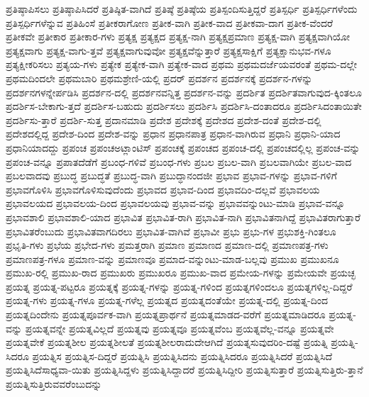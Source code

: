 {ಪ್ರತಿಷ್ಠಾಪಿಸಲು
ಪ್ರತಿಷ್ಠಾಪಿಸಿದರೆ
ಪ್ರತಿಷ್ಠಿತ-ವಾಗಿದೆ
ಪ್ರತಿಷ್ಠೆ
ಪ್ರತಿಷ್ಠೆಯ
ಪ್ರತಿಸ್ಪಂದಿಸುತ್ತಿದ್ದರೆ
ಪ್ರತಿಸ್ಪರ್ಧಿ
ಪ್ರತಿಸ್ಪರ್ಧಿಗಳೆಂದು
ಪ್ರತಿಸ್ಪರ್ಧಿಗಳೆನ್ನುವ
ಪ್ರತಿಹಿಂಸೆ
ಪ್ರತೀಕರಾಗೋಣ
ಪ್ರತೀಕ-ವಾಗಿ
ಪ್ರತೀಕ-ವಾದ
ಪ್ರತೀಕವಾ-ದಾಗ
ಪ್ರತೀಕ-ವೆಂದರೆ
ಪ್ರತೀಕವೇ
ಪ್ರತೀಕಾರ
ಪ್ರತೀಕಾರ-ಗಳು
ಪ್ರತ್ಯಕ್ಷ
ಪ್ರತ್ಯಕ್ಷದ
ಪ್ರತ್ಯಕ್ಷ-ನಾಗಿ
ಪ್ರತ್ಯಕ್ಷಪ್ರಮಾಣ
ಪ್ರತ್ಯಕ್ಷ-ವಾಗಿ
ಪ್ರತ್ಯಕ್ಷವಾಗಿಯೋ
ಪ್ರತ್ಯಕ್ಷವಾಗು
ಪ್ರತ್ಯಕ್ಷ-ವಾಗು-ತ್ತವೆ
ಪ್ರತ್ಯಕ್ಷವಾಗುವುವೋ
ಪ್ರತ್ಯಕ್ಷವೆನ್ನುತ್ತಾರೆ
ಪ್ರತ್ಯಕ್ಷಸಾಕ್ಷಿಗೆ
ಪ್ರತ್ಯಕ್ಷಾನುಭವ-ಗಳೂ
ಪ್ರತ್ಯಕ್ಷೀಕರಿಸಲು
ಪ್ರತ್ಯಯ-ಗಳು
ಪ್ರತ್ಯೇಕ
ಪ್ರತ್ಯೇಕ-ವಾಗಿ
ಪ್ರತ್ಯೇಕ-ವಾದ
ಪ್ರಥಮ
ಪ್ರಥಮದರ್ಜೆಯವರಂತೆ
ಪ್ರಥಮ-ದಲ್ಲೇ
ಪ್ರಥಮದಿಂದಲೇ
ಪ್ರಥಮಬಾರಿ
ಪ್ರಥಮಶ್ರೇಣಿ-ಯಲ್ಲಿ
ಪ್ರದರ್
ಪ್ರದರ್ಶನ
ಪ್ರದರ್ಶನಕ್ಕೆ
ಪ್ರದರ್ಶನ-ಗಳನ್ನು
ಪ್ರದರ್ಶನಗಳನ್ನೇರ್ಪಡಿಸಿ
ಪ್ರದರ್ಶನ-ದಲ್ಲಿ
ಪ್ರದರ್ಶನವನ್ನಿತ್ತ
ಪ್ರದರ್ಶನ-ವನ್ನು
ಪ್ರದರ್ಶಿತ
ಪ್ರದರ್ಶಿತವಾಗುವುದ-ಕ್ಕಿಂತಲೂ
ಪ್ರದರ್ಶಿಸ-ಬೇಕಾಗು-ತ್ತದೆ
ಪ್ರದರ್ಶಿಸ-ಬಹುದು
ಪ್ರದರ್ಶಿಸಲು
ಪ್ರದರ್ಶಿಸಿ
ಪ್ರದರ್ಶಿಸಿ-ದಂತಾದರೂ
ಪ್ರದರ್ಶಿಸಿದಂತಾಯಿತೇ
ಪ್ರದರ್ಶಿಸು-ತ್ತಾರೆ
ಪ್ರದರ್ಶಿ-ಸುತ್ತ
ಪ್ರದಾನಮಾಡಿ
ಪ್ರದೇಶ
ಪ್ರದೇಶಕ್ಕೆ
ಪ್ರದೇಶದ
ಪ್ರದೇಶ-ದಂತೆ
ಪ್ರದೇಶ-ದಲ್ಲಿ
ಪ್ರದೇಶದಲ್ಲಿದ್ದ
ಪ್ರದೇಶ-ದಿಂದ
ಪ್ರದೇಶ-ವನ್ನು
ಪ್ರಧಾನ
ಪ್ರಧಾನಪಾತ್ರ
ಪ್ರಧಾನ-ವಾಗಿರುವ
ಪ್ರಧಾನಿ
ಪ್ರಧಾನಿ-ಯಾದ
ಪ್ರಧಾನಿಯಾದದ್ದು
ಪ್ರಪಂಚ
ಪ್ರಪಂಚಅಟ್ಲಾಂಟಿಸ್
ಪ್ರಪಂಚಕ್ಕೆ
ಪ್ರಪಂಚದ
ಪ್ರಪಂಚ-ದಲ್ಲಿ
ಪ್ರಪಂಚದಲ್ಲಿಲ್ಲ
ಪ್ರಪಂಚ-ವನ್ನು
ಪ್ರಪಂಚ-ವನ್ನೂ
ಪ್ರಪಾತದೆಡೆಗೆ
ಪ್ರಬಂಧ-ಗಳಿವೆ
ಪ್ರಬಂಧ-ಗಳು
ಪ್ರಬಲ
ಪ್ರಬಲ-ವಾಗಿ
ಪ್ರಬಲವಾಗಿಯೇ
ಪ್ರಬಲ-ವಾದ
ಪ್ರಬಲವಾದವು
ಪ್ರಬುದ್ಧ
ಪ್ರಬುದ್ಧತೆ
ಪ್ರಬುದ್ಧ-ವಾಗಿ
ಪ್ರಬುದ್ಧಾನಂದಜೀ
ಪ್ರಭಾವ
ಪ್ರಭಾವ-ಗಳನ್ನು
ಪ್ರಭಾವ-ಗಳಿಗೆ
ಪ್ರಭಾವಗೊಳಿಸಿ
ಪ್ರಭಾವಗೊಳಿಸುವುದೆಂದು
ಪ್ರಭಾವದ
ಪ್ರಭಾವ-ದಿಂದ
ಪ್ರಭಾವದಿಂ-ದಲ್ಲವೆ
ಪ್ರಭಾವಲಯ
ಪ್ರಭಾವಲಯದ
ಪ್ರಭಾವಲಯ-ದಿಂದ
ಪ್ರಭಾವಲಯವು
ಪ್ರಭಾವ-ವನ್ನು
ಪ್ರಭಾವವನ್ನುಂಟು-ಮಾಡಿ
ಪ್ರಭಾವ-ವನ್ನೂ
ಪ್ರಭಾವಶಾಲಿ
ಪ್ರಭಾವಶಾಲಿ-ಯಾದ
ಪ್ರಭಾವಿತ
ಪ್ರಭಾವಿತ-ರಾಗಿ
ಪ್ರಭಾವಿತ-ನಾಗಿ
ಪ್ರಭಾವಿತನಾಗಿದ್ದೆ
ಪ್ರಭಾವಿತರಾಗುತ್ತಾರೆ
ಪ್ರಭಾವಿತರೆಂಬುದು
ಪ್ರಭಾವಿತವಾಗದಿರಲು
ಪ್ರಭಾವಿತ-ವಾಗಿವೆ
ಪ್ರಭಾವೀ
ಪ್ರಭು
ಪ್ರಭು-ಗಳ
ಪ್ರಭುಶಕ್ತಿ-ಗಿಂತಲೂ
ಪ್ರಭೃತಿ-ಗಳು
ಪ್ರಭೆಯ
ಪ್ರಭೇದ-ಗಳು
ಪ್ರಮತ್ತರಾಗಿ
ಪ್ರಮಾಣ
ಪ್ರಮಾಣದ
ಪ್ರಮಾಣ-ದಲ್ಲಿ
ಪ್ರಮಾಣಪತ್ರ-ಗಳು
ಪ್ರಮಾಣಪತ್ರ-ಗಳೂ
ಪ್ರಮಾಣ-ವನ್ನು
ಪ್ರಮಾಣವೂ
ಪ್ರಮಾದ-ವನ್ನುಂಟು-ಮಾಡ-ಬಲ್ಲವು
ಪ್ರಮುಖ
ಪ್ರಮುಖನೂ
ಪ್ರಮುಖ-ರಲ್ಲಿ
ಪ್ರಮುಖ-ರಾದ
ಪ್ರಮುಖರು
ಪ್ರಮುಖರೂ
ಪ್ರಮುಖ-ವಾದ
ಪ್ರಮೇಯ-ಗಳನ್ನು
ಪ್ರಮೇಯವೇ
ಪ್ರಯಚ್ಛ
ಪ್ರಯತ್ನ
ಪ್ರಯತ್ನ-ಪಟ್ಟರೂ
ಪ್ರಯತ್ನಕ್ಕೆ
ಪ್ರಯತ್ನ-ಗಳನ್ನು
ಪ್ರಯತ್ನ-ಗಳಿಂದ
ಪ್ರಯತ್ನಗಳಿಂದಲೂ
ಪ್ರಯತ್ನಗಳಿಲ್ಲ-ದಿದ್ದರೆ
ಪ್ರಯತ್ನ-ಗಳು
ಪ್ರಯತ್ನ-ಗಳೂ
ಪ್ರಯತ್ನ-ಗಳೆಲ್ಲ
ಪ್ರಯತ್ನದ
ಪ್ರಯತ್ನದಂತೆಯೇ
ಪ್ರಯತ್ನ-ದಲ್ಲಿ
ಪ್ರಯತ್ನ-ದಿಂದ
ಪ್ರಯತ್ನದಿಂದೇನು
ಪ್ರಯತ್ನಪೂರ್ವಕ-ವಾಗಿ
ಪ್ರಯತ್ನಪ್ರಾರ್ಥನೆ
ಪ್ರಯತ್ನಮಾಡದ-ವರೆಗೆ
ಪ್ರಯತ್ನಮಾಡಿದರೂ
ಪ್ರಯತ್ನ-ವನ್ನು
ಪ್ರಯತ್ನವನ್ನೇ
ಪ್ರಯತ್ನವಿಲ್ಲದೆ
ಪ್ರಯತ್ನವು
ಪ್ರಯತ್ನವೂ
ಪ್ರಯತ್ನವೆಂಬ
ಪ್ರಯತ್ನವೆಲ್ಲ-ವನ್ನೂ
ಪ್ರಯತ್ನವೇ
ಪ್ರಯತ್ನವೇಕೆ
ಪ್ರಯತ್ನಶೀಲ
ಪ್ರಯತ್ನಶೀಲತೆ
ಪ್ರಯತ್ನಶೀಲರಾದುದೇಆಗಿದೆ
ಪ್ರಯತ್ನಸುವುದರಿಂ-ದಷ್ಟೆ
ಪ್ರಯತ್ನಿ
ಪ್ರಯತ್ನಿ-ಸಿದರೂ
ಪ್ರಯತ್ನಿಸ
ಪ್ರಯತ್ನಿಸ-ದಿದ್ದರೆ
ಪ್ರಯತ್ನಿಸಿ
ಪ್ರಯತ್ನಿಸಿದನು
ಪ್ರಯತ್ನಿಸಿದರೂ
ಪ್ರಯತ್ನಿಸಿದರೆ
ಪ್ರಯತ್ನಿಸಿದೆ
ಪ್ರಯತ್ನಿಸಿದೆಸಾಧ್ಯವಾ-ಯಿತು
ಪ್ರಯತ್ನಿಸಿದ್ದಳು
ಪ್ರಯತ್ನಿಸಿದ್ದಾದರೆ
ಪ್ರಯತ್ನಿಸಿದ್ದೀರಿ
ಪ್ರಯತ್ನಿಸುತ್ತಾರೆ
ಪ್ರಯತ್ನಿಸುತ್ತಿರು-ತ್ತಾನೆ
ಪ್ರಯತ್ನಿಸುತ್ತಿರುವವರೆಂಬುದನ್ನು
}
